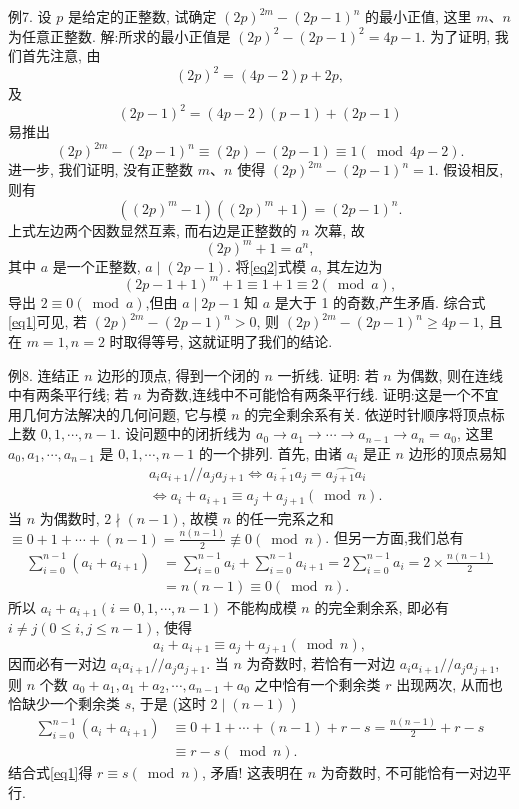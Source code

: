 例7. 设 $p$ 是给定的正整数, 试确定 $(2 p)^{2 m}-(2 p-1)^n$ 的最小正值, 这里 $m 、 n$ 为任意正整数.
解:所求的最小正值是 $(2 p)^2-(2 p-1)^2=4 p-1$. 为了证明, 我们首先注意, 由
$$
(2 p)^2=(4 p-2) p+2 p,
$$
及
$$
(2 p-1)^2=(4 p-2)(p-1)+(2 p-1)
$$
易推出
$$
(2 p)^{2 m}-(2 p-1)^n \equiv(2 p)-(2 p-1) \equiv 1(\bmod 4 p-2) . \label{eq1}
$$
进一步, 我们证明, 没有正整数 $m 、 n$ 使得 $(2 p)^{2 m}-(2 p-1)^n=1$. 假设相反, 则有
$$
\left((2 p)^m-1\right)\left((2 p)^m+1\right)=(2 p-1)^n .
$$
上式左边两个因数显然互素, 而右边是正整数的 $n$ 次幕, 故
$$
(2 p)^m+1=a^n, \label{eq2}
$$
其中 $a$ 是一个正整数, $a \mid(2 p-1)$. 将\ref{eq2}式模 $a$, 其左边为
$$
(2 p-1+1)^m+1 \equiv 1+1 \equiv 2(\bmod a),
$$
导出 $2 \equiv 0(\bmod a)$,但由 $a \mid 2 p-1$ 知 $a$ 是大于 1 的奇数,产生矛盾.
综合式\ref{eq1}可见, 若 $(2 p)^{2 m}-(2 p-1)^n>0$, 则 $(2 p)^{2 m}-(2 p-1)^n \geqslant 4 p-1$, 且在 $m=1, n=2$ 时取得等号, 这就证明了我们的结论.



例8. 连结正 $n$ 边形的顶点, 得到一个闭的 $n$ 一折线.
证明: 若 $n$ 为偶数, 则在连线中有两条平行线; 若 $n$ 为奇数,连线中不可能恰有两条平行线.
证明:这是一个不宜用几何方法解决的几何问题, 它与模 $n$ 的完全剩余系有关.
依逆时针顺序将顶点标上数 $0,1, \cdots, n-1$. 设问题中的闭折线为 $a_0 \rightarrow a_1 \rightarrow \cdots \rightarrow a_{n-1} \rightarrow a_n=a_0$, 这里 $a_0, a_1, \cdots, a_{n-1}$ 是 $0,1, \cdots, n-1$ 的一个排列.
首先, 由诸 $a_i$ 是正 $n$ 边形的顶点易知
$$
\begin{aligned}
& a_i a_{i+1} / / a_j a_{j+1} \Leftrightarrow \widetilde{a_{i+1} a_j}=\widehat{a_{j+1} a_i} \\
& \Leftrightarrow a_i+a_{i+1} \equiv a_j+a_{j+1}(\bmod n) .
\end{aligned}
$$
当 $n$ 为偶数时, $2 \nmid(n-1)$, 故模 $n$ 的任一完系之和 $\equiv 0+1+\cdots+(n-1)= \frac{n(n-1)}{2} \not \equiv 0(\bmod n)$.
但另一方面,我们总有
$$
\begin{aligned}
\sum_{i=0}^{n-1}\left(a_i+a_{i+1}\right) & =\sum_{i=0}^{n-1} a_i+\sum_{i=0}^{n-1} a_{i+1}=2 \sum_{i=0}^{n-1} a_i=2 \times \frac{n(n-1)}{2} \\
& =n(n-1) \equiv 0(\bmod n) . \label{eq1}
\end{aligned}
$$
所以 $a_i+a_{i+1}(i=0,1, \cdots, n-1)$ 不能构成模 $n$ 的完全剩余系, 即必有 $i \neq j(0 \leqslant i, j \leqslant n-1)$, 使得
$$
a_i+a_{i+1} \equiv a_j+a_{j+1}(\bmod n),
$$
因而必有一对边 $a_i a_{i+1} / / a_j a_{j+1}$.
当 $n$ 为奇数时, 若恰有一对边 $a_i a_{i+1} / / a_j a_{j+1}$, 则 $n$ 个数 $a_0+a_1, a_1+ a_2, \cdots, a_{n-1}+a_0$ 之中恰有一个剩余类 $r$ 出现两次, 从而也恰缺少一个剩余类 $s$, 于是 (这时 $2 \mid(n-1)$ )
$$
\begin{aligned}
\sum_{i=0}^{n-1}\left(a_i+a_{i+1}\right) & \equiv 0+1+\cdots+(n-1)+r-s=\frac{n(n-1)}{2}+r-s \\
& \equiv r-s(\bmod n) .
\end{aligned}
$$
结合式\ref{eq1}得 $r \equiv s(\bmod n)$, 矛盾! 这表明在 $n$ 为奇数时, 不可能恰有一对边平行.



